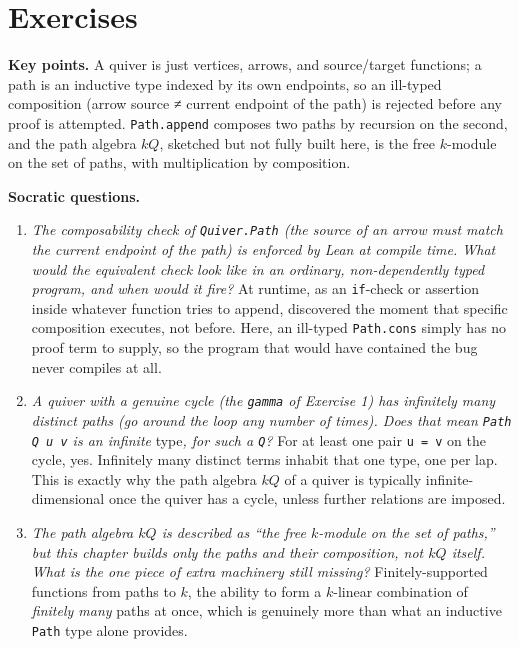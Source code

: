 \section{Exercises}\label{sec:12-path-algebras:06-exercises:1}

\textbf{Key points.} A quiver is just vertices, arrows, and source/target functions; a path is an inductive type indexed by its own endpoints, so an ill-typed composition (arrow source ≠ current endpoint of the path) is rejected before any proof is attempted. \texttt{Path.append} composes two paths by recursion on the second, and the path algebra \(kQ\), sketched but not fully built here, is the free \(k\)-module on the set of paths, with multiplication by composition.

\textbf{Socratic questions.}

\begin{enumerate}
\def\labelenumi{\arabic{enumi}.}
\item
  \emph{The composability check of \texttt{Quiver.Path} (the source of an arrow must match the current endpoint of the path) is enforced by Lean at compile time. What would the equivalent check look like in an ordinary, non-dependently typed program, and when would it fire?} At runtime, as an \texttt{if}-check or assertion inside whatever function tries to append, discovered the moment that specific composition executes, not before. Here, an ill-typed \texttt{Path.cons} simply has no proof term to supply, so the program that would have contained the bug never compiles at all.
\item
  \emph{A quiver with a genuine cycle (the \texttt{gamma} of Exercise 1) has infinitely many distinct paths (go around the loop any number of times). Does that mean \texttt{Path Q u v} is an infinite }type\emph{, for such a \texttt{Q}?} For at least one pair \texttt{u = v} on the cycle, yes. Infinitely many distinct terms inhabit that one type, one per lap. This is exactly why the path algebra \(kQ\) of a quiver is typically infinite-dimensional once the quiver has a cycle, unless further relations are imposed.
\item
  \emph{The path algebra \(kQ\) is described as ``the free \(k\)-module on the set of paths,'' but this chapter builds only the paths and their composition, not \(kQ\) itself. What is the one piece of extra machinery still missing?} Finitely-supported functions from paths to \(k\), the ability to form a \(k\)-linear combination of \emph{finitely many} paths at once, which is genuinely more than what an inductive \texttt{Path} type alone provides.

\end{enumerate}
